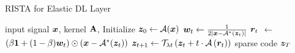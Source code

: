 \begin{algorithm}[h!]
   \caption{RISTA for Elastic DL Layer}
   \label{alg:irls-ista}
\begin{algorithmic}
    input signal ${\bm{x}}$, kernel ${\mathbf{A}}$, 
   \STATE Initialize ${\bm{z}}_0\leftarrow{\mathcal{A}}({\bm{x}})$
    \STATE ${\bm{w}}_t\leftarrow\frac{1}{2|{\bm{x}}-{\mathcal{A}}^*({\bm{z}}_t)|}$
    \STATE ${\bm{r}}_t$ $\leftarrow $ $\left(\beta \mathbf{1} + (1-\beta) {\bm{w}}_t\right)\odot\left({\bm{x}}-{\mathcal{A}}^*({\bm{z}}_t)\right)$
    \STATE ${\bm{z}}_{t+1}\leftarrow\mathcal{T}_{\lambda t} \left( {\bm{z}}_t+t\cdot {\mathcal{A}}\left( {\bm{r}}_t\right)\right)$
   \ENDFOR
     sparse code ${\bm{z}}_T$
\end{algorithmic}
\end{algorithm}














